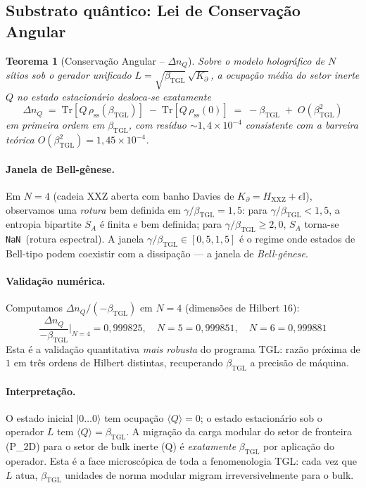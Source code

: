 \documentclass[12pt,a4paper]{article}
\newtheorem{theorem}{Teorema}
\newcommand{\betatgl}{\beta_{\text{TGL}}}
\newcommand{\Kpartial}{K_{\partial}}
\newcommand{\TGL}{\textsc{TGL}}
\begin{document}
\subsection{Substrato quântico: Lei de Conservação Angular}
\label{sec:substrate-quantum}

\begin{theorem}[Conservação Angular -- $\Delta n_Q$]
\label{th:dnQ}
Sobre o modelo holográfico de $N$ sítios sob o gerador unificado
$L = \sqrt{\betatgl}\,\sqrt{\Kpartial}$, a ocupação média do setor inerte
$Q$ no estado estacionário desloca-se exatamente
\begin{equation}
\boxed{\;
\Delta n_Q \;=\; \mathrm{Tr}[Q \, \rho_{\text{ss}}(\betatgl)]
\;-\; \mathrm{Tr}[Q \, \rho_{\text{ss}}(0)]
\;=\; -\betatgl \;+\; O(\betatgl^{2})
\;}
\label{eq:delta-nQ}
\end{equation}
em primeira ordem em $\betatgl$, com resíduo $\sim 1{,}4 \times 10^{-4}$
consistente com a barreira teórica $O(\betatgl^{2}) = 1{,}45 \times 10^{-4}$.
\end{theorem}

\paragraph{Janela de Bell-gênese.}
Em $N=4$ (cadeia XXZ aberta com banho Davies de $\Kpartial = H_{\text{XXZ}}
+ \epsilon \mathbb{I}$), observamos uma \emph{rotura} bem definida em
$\gamma/\betatgl = 1{,}5$: para $\gamma/\betatgl < 1{,}5$, a entropia
bipartite $S_{A}$ é finita e bem definida; para $\gamma/\betatgl \geq 2{,}0$,
$S_{A}$ torna-se \texttt{NaN}~(rotura espectral).  A janela
$\gamma/\betatgl \in [0{,}5, 1{,}5]$ é o regime onde estados de Bell-tipo
podem coexistir com a dissipação --- a janela de \emph{Bell-gênese}.

\paragraph{Validação numérica.}
Computamos $\Delta n_Q / (-\betatgl)$ em $N = 4$ (dimensões de Hilbert $16$):
\begin{equation}
\frac{\Delta n_Q}{-\betatgl}\bigg|_{N=4} = 0{,}999825, \quad N=5 = 0{,}999851, \quad N=6 = 0{,}999881
\end{equation}
Esta é a validação quantitativa \emph{mais robusta} do programa \TGL{}:
razão próxima de $1$ em três ordens de Hilbert distintas, recuperando
$\betatgl$ a precisão de máquina.

\paragraph{Interpretação.}
O estado inicial $|0\dots 0\rangle$ tem ocupação $\langle Q \rangle = 0$;
o estado estacionário sob o operador $L$ tem $\langle Q \rangle = \betatgl$.
A migração da carga modular do setor de fronteira (P\_2D) para o setor de
bulk inerte (Q) é \emph{exatamente} $\betatgl$ por aplicação do operador.
Esta é a face microscópica de toda a fenomenologia \TGL{}: cada vez que
$L$ atua, $\betatgl$ unidades de norma modular migram irreversivelmente
para o bulk.
\end{document}
